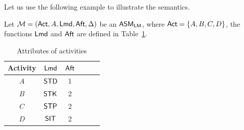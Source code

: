 Let us use the following example to illustrate the semantics.
\begin{example}
	Let ${\mathcal{M} } = ({\sf Act},A,{\sf Lmd},{\sf Aft},\Delta)$ be an $\textsf{ASM}_\textsf{LM}$, where ${\sf Act} = \{A,B,C,D\}$, the functions ${\sf Lmd}$ and ${\sf Aft}$ are defined in Table~\ref{tab-attribute}.
	\begin{table}[htbp]
		\begin{center}
		\begin{tabular}{|c|c|c|c|c|c|}
		\hline
		Activity & ${\sf Lmd}$ & ${\sf Aft}$\\
		\hline
		$A$ & $\mathsf{STD}$ & 1 \\
		\hline
		$B$ & $\mathsf{STK}$ & 2 \\
		\hline
		$C$ & $\mathsf{STP}$ & 2 \\
		\hline
		$D$ & $\mathsf{SIT}$ & 2 \\
		\hline
		\end{tabular}
		\caption{Attributes of activities}
		\label{tab-attribute}
		\end{center}
	\end{table}
			

\end{example}
